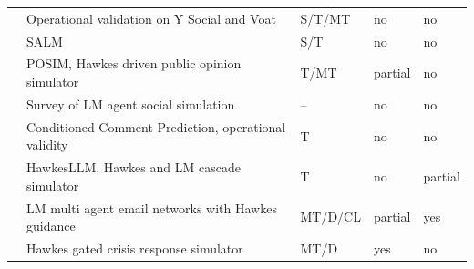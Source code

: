 \begin{table}[t]
{\begin{tabular}{lllll}
\citet{tomasevic2026operational}
    & Operational validation on Y Social and Voat & S/T/MT & no & no \\

\citet{koley2025salm}
    & SALM & S/T & no & no \\

\citet{zhang2026posim}
    & POSIM, Hawkes driven public opinion simulator & T/MT & partial & no \\

\citet{mou2026society}
    & Survey of LM agent social simulation & -- & no & no \\

\citet{schwager2026operational}
    & Conditioned Comment Prediction, operational validity & T & no & no \\

\citet{deng2026hawkesllm}
    & HawkesLLM, Hawkes and LM cascade simulator & T & no & partial \\

\citet{miao2026email}
    & LM multi agent email networks with Hawkes guidance
    & MT/D/CL & partial & yes \\

\citet{zhang2026crisis}
    & Hawkes gated crisis response simulator & MT/D & yes & no \\

\bottomrule
\end{tabular}}
\end{table}
